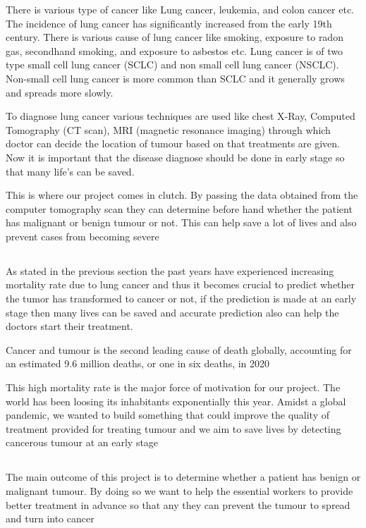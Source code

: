 \documentclass[12pt]{article}
\newcommand{\msize}{\fontsize{14pt}{12pt}\selectfont}
\begin{document}
There is various type of cancer like Lung cancer, leukemia, and colon cancer etc. The incidence of lung cancer has significantly increased from the early 19th century. There is various cause of lung cancer like smoking, exposure to radon gas, secondhand smoking, and exposure to asbestos etc. Lung cancer is of two type small cell lung cancer (SCLC) and non small cell lung cancer (NSCLC). Non-small cell lung cancer is more common than SCLC and it generally grows and spreads more slowly.

To diagnose lung cancer various techniques are used like chest X-Ray, Computed Tomography (CT scan), MRI (magnetic resonance imaging) through which doctor can decide the location of tumour based on that treatments are given. Now it is important that the disease diagnose should be done in early stage so that many life’s can be saved. 

This is where our project comes in clutch. By passing the data obtained from the computer tomography scan they can determine before hand whether the patient has malignant or benign tumour or not. This can help save a lot of lives and also prevent cases from becoming severe
\newpage 
\subsection{\msize{\textbf{MOTIVATION}}}
As stated in the previous section the past years have experienced increasing mortality rate due to lung cancer and thus it becomes crucial to predict whether the tumor has transformed to cancer or not, if the prediction is made at an early stage then many lives can be saved and accurate prediction also can help the doctors start their treatment.

Cancer and tumour is the second leading cause of death globally, accounting for an estimated 9.6 million deaths, or one in six deaths, in 2020 

This high mortality rate is the major force of motivation for our project. The world has been loosing its inhabitants exponentially this year. Amidst a global pandemic, we wanted to build something that could improve the quality of treatment provided for treating tumour and we aim to save lives by detecting cancerous tumour at an early stage 

\newpage
\subsection{\msize{\textbf{OUTCOME}}}
The main outcome of this project is to determine whether a patient has benign or malignant tumour. By doing so we want to help the essential workers to provide better treatment in advance so that any they can prevent the tumour to spread and turn into cancer 
\end{document}

